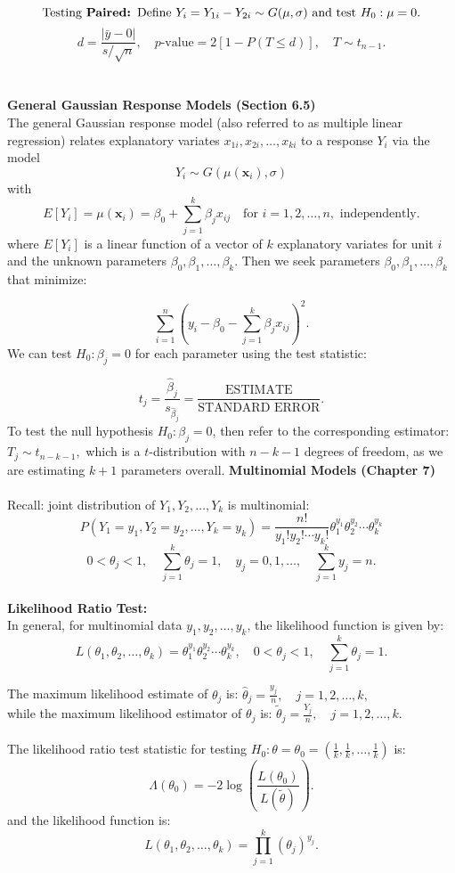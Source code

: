 \documentclass[a4paper,12pt]{article}
\begin{document}
\[
\text{Testing \textbf{Paired: }Define } Y_i = Y_{1i} - Y_{2i} \sim G(\mu, \sigma) \text{ and test } H_0 : \mu = 0.
\]
\[
d = \frac{| \bar{y} - 0 |}{s / \sqrt{n}}, \quad p\text{-value} = 2 \left[ 1 - P(T \leq d) \right], \quad T \sim t_{n-1}.
\]
\\
\\\textbf{General Gaussian Response Models (Section 6.5)}
\\
The general Gaussian response model (also referred to as multiple linear regression) relates explanatory variates 
$x_{1i}, x_{2i}, \dots, x_{ki}$ to a response $Y_i$ via the model 
\[
Y_i \sim G(\mu(\mathbf{x}_i), \sigma)
\]
with
\[E[Y_i] = \mu(\mathbf{x}_i) = \beta_0 + \sum_{j=1}^k \beta_j x_{ij} \quad \text{for } i = 1, 2, \dots, n, \text{ independently.}
\]
where \(E[Y_i]\) is a linear function of a vector of \(k\) explanatory variates for unit \(i\) and the unknown parameters \(\beta_0, \beta_1, \dots, \beta_k\). Then we seek parameters \(\beta_0, \beta_1, \dots, \beta_k\) that minimize:

\[
\sum_{i=1}^{n} \left( y_i - \beta_0 - \sum_{j=1}^{k} \beta_j x_{ij} \right)^2.
\]
We can test \(H_0 : \beta_j = 0\) for each parameter using the test statistic:

\[
t_j = \frac{\hat{\beta}_j}{s_{\hat{\beta}_j}} = \frac{\text{ESTIMATE}}{\text{STANDARD ERROR}}.
\]
To test the null hypothesis $H_0 : \beta_j = 0$, then refer to the corresponding estimator: $ T_j \sim t_{n-k-1}, $ which is a $t$-distribution with $n - k - 1$ degrees of freedom, as we are estimating \(k + 1\) parameters overall.
\newpage
\textbf{Multinomial Models (Chapter 7)}
\\
\\Recall: joint distribution of \(Y_1, Y_2, \ldots, Y_k\) is multinomial:
\[
P(Y_1 = y_1, Y_2 = y_2, \ldots, Y_k = y_k) = 
\frac{n!}{y_1! y_2! \cdots y_k!} \theta_1^{y_1} \theta_2^{y_2} \cdots \theta_k^{y_k}
\] \[
0 < \theta_j < 1, \quad \sum_{j=1}^k \theta_j = 1, \quad y_j = 0, 1, \ldots, \quad \sum_{j=1}^k y_j = n.
\]
\\\textbf{Likelihood Ratio Test:}
\\In general, for multinomial data \(y_1, y_2, \ldots, y_k\), the likelihood function is given by:
\[
L(\theta_1, \theta_2, \ldots, \theta_k) = \theta_1^{y_1} \theta_2^{y_2} \cdots \theta_k^{y_k}, \quad 0 < \theta_j < 1, \quad \sum_{j=1}^k \theta_j = 1.
\]

The maximum likelihood estimate of \(\theta_j\) is:
\(
\hat{\theta}_j = \frac{y_j}{n}, \quad j = 1, 2, \ldots, k,
\)
\\while the maximum likelihood estimator of \(\theta_j\) is:
\(
\tilde{\theta}_j = \frac{Y_j}{n}, \quad j = 1, 2, \ldots, k.
\)
\\
\\The likelihood ratio test statistic for testing \(H_0 : \theta = \theta_0 = \left(\frac{1}{k}, \frac{1}{k}, \ldots, \frac{1}{k}\right)\) is:
\[
\Lambda(\theta_0) = -2 \log \left( \frac{L(\theta_0)}{L(\tilde{\theta})} \right).
\]
and the likelihood function is:
\[
L(\theta_1, \theta_2, \ldots, \theta_k) = \prod_{j=1}^k (\theta_j)^{y_j}.
\]
\end{document}
